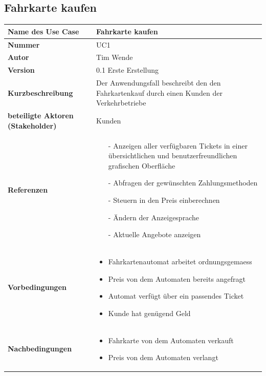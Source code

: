 \documentclass{article}
\begin{document}
    \subsection{Fahrkarte kaufen}
    \begin{tabularx}{\textwidth}{|l|X|}
        \hline        
        \textcolor{fhmint}{\textbf{Name des Use Case}} & \LARGE\textcolor{fhmint}{\textbf{Fahrkarte kaufen}}\\
        \hline
        \textbf{Nummer} & UC1 \\\hline
        \textbf{Autor} & Tim Wende \\\hline
        \textbf{Version} & 0.1 Erste Erstellung \\\hline
        \textbf{Kurzbeschreibung} & Der Anwendungsfall beschreibt den den Fahrkartenkauf durch einen Kunden der Verkehrbetriebe \\\hline
        \textbf{beteiligte Aktoren (\gls{Stakeholder})} & \gls{Kunden} \\\hline
        \textbf{Referenzen} & \begin{itemize}
            \item[-] Anzeigen aller verfügbaren \gls{Tickets} in einer übersichtlichen und benutzerfreundlichen grafischen Oberfläche
            \item[-] Abfragen der gewünschten \gls{Zahlungsmethoden}
            \item[-] \gls{Steuern} in den Preis einberechnen
            \item[-] Ändern der \gls{Anzeigesprache}
            \item[-] Aktuelle Angebote anzeigen
        \end{itemize} \\\hline
        \textbf{Vorbedingungen} & \begin{itemize}
            \item Fahrkartenautomat arbeitet \gls{ordnungsgemaess}
            \item Preis von dem Automaten bereits angefragt
            \item Automat verfügt über ein passendes \gls{Ticket}
            \item \gls{Kunde} hat genügend Geld
        \end{itemize} \\\hline
        \textbf{Nachbedingungen} & \begin{itemize}
            \item Fahrkarte von dem Automaten verkauft
            \item Preis von dem Automaten verlangt

\end{itemize}
\end{tabularx}
\end{document}
